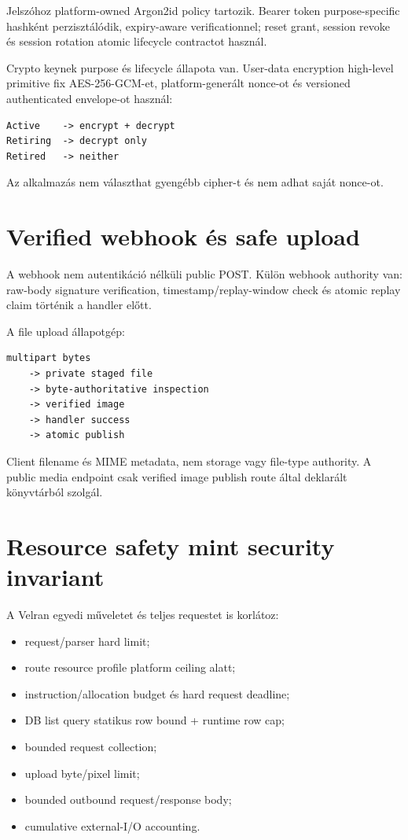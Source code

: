 Jelszóhoz platform-owned Argon2id policy tartozik. Bearer token purpose-specific hashként perzisztálódik, expiry-aware verificationnel; reset grant, session revoke és session rotation atomic lifecycle contractot használ.

Crypto keynek purpose és lifecycle állapota van. User-data encryption high-level primitive fix AES-256-GCM-et, platform-generált nonce-ot és versioned authenticated envelope-ot használ:

\begin{lstlisting}
Active    -> encrypt + decrypt
Retiring  -> decrypt only
Retired   -> neither
\end{lstlisting}

Az alkalmazás nem választhat gyengébb cipher-t és nem adhat saját nonce-ot.

\section{Verified webhook és safe upload}

A webhook nem autentikáció nélküli public POST. Külön webhook authority van: raw-body signature verification, timestamp/replay-window check és atomic replay claim történik a handler előtt.

A file upload állapotgép:

\begin{lstlisting}
multipart bytes
    -> private staged file
    -> byte-authoritative inspection
    -> verified image
    -> handler success
    -> atomic publish
\end{lstlisting}

Client filename és MIME metadata, nem storage vagy file-type authority. A public media endpoint csak verified image publish route által deklarált könyvtárból szolgál.

\section{Resource safety mint security invariant}

A Velran egyedi műveletet és teljes requestet is korlátoz:

\begin{itemize}
  \item request/parser hard limit;
  \item route resource profile platform ceiling alatt;
  \item instruction/allocation budget és hard request deadline;
  \item DB list query statikus row bound + runtime row cap;
  \item bounded request collection;
  \item upload byte/pixel limit;
  \item bounded outbound request/response body;
  \item cumulative external-I/O accounting.
\end{itemize}

